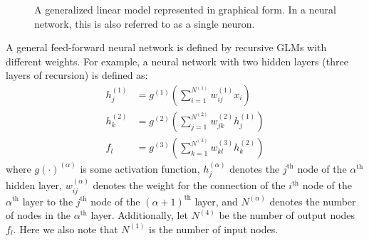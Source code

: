 \documentclass[12pt]{article}
\begin{document}
\def\layersep{2.5cm}
\begin{figure}[h]
\centering{}

\caption{\label{fig:GLM}
A generalized linear model represented in graphical form.
In a neural network, this is also referred to as a single neuron.
}
\end{figure}

\pagebreak

A general feed-forward neural network is defined by recursive GLMs
with different weights.
For example, a neural network with two hidden layers
(three layers of recursion) is defined as:
%
\begin{equation}
\begin{aligned}
	h^{(1)}_j &= g^{(1)}
		\left(\sum_{i=1}^{N^{(1)}} w_{ij}^{(1)} x_i \right) \\
	h^{(2)}_k &= g^{(2)}
		\left(\sum_{j=1}^{N^{(2)}} w_{jk}^{(2)} h_j^{(1)} \right) \\
	f_l &= g^{(3)}
		\left(\sum_{k=1}^{N^{(3)}} w_{kl}^{(3)} h_k^{(2)} \right)
\end{aligned}
\end{equation}
%
where $g(\cdot)^{(\alpha)}$ is some activation function,
$h^{(\alpha)}_j$ denotes the $j^\text{th}$ node of the $\alpha^\text{th}$ 
hidden layer,
$w_{ij}^{(\alpha)}$ denotes the weight for the connection of 
the $i^\text{th}$ node of the $\alpha^\text{th}$ layer to 
the $j^\text{th}$ node of the $(\alpha+1)^\text{th}$ layer,
and $N^{(\alpha)}$ denotes the number of nodes in the $\alpha^\text{th}$ layer.
Additionally, let $N^{(4)}$ be the number of 
output nodes $f_l$.
Here we also note that $N^{(1)}$ is the number of input nodes.
\end{document}
